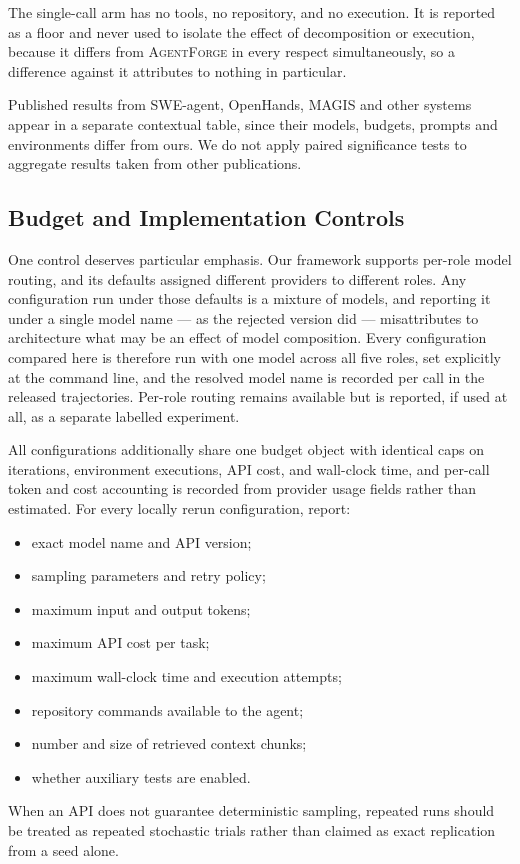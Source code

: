 \documentclass[journal]{IEEEtran}
\newcommand{\agentforge}{\textsc{AgentForge}}
\begin{document}
The single-call arm has no tools, no repository, and no execution. It is reported as a floor and never used to isolate the effect of decomposition or execution, because it differs from \agentforge{} in every respect simultaneously, so a difference against it attributes to nothing in particular.

Published results from SWE-agent, OpenHands, MAGIS and other systems appear in a separate contextual table, since their models, budgets, prompts and environments differ from ours. We do not apply paired significance tests to aggregate results taken from other publications.

\subsection{Budget and Implementation Controls}

One control deserves particular emphasis. Our framework supports per-role model routing, and its defaults assigned different providers to different roles. Any configuration run under those defaults is a mixture of models, and reporting it under a single model name — as the rejected version did — misattributes to architecture what may be an effect of model composition. Every configuration compared here is therefore run with one model across all five roles, set explicitly at the command line, and the resolved model name is recorded per call in the released trajectories. Per-role routing remains available but is reported, if used at all, as a separate labelled experiment.

All configurations additionally share one budget object with identical caps on iterations, environment executions, API cost, and wall-clock time, and per-call token and cost accounting is recorded from provider usage fields rather than estimated. For every locally rerun configuration, report:
\begin{itemize}
    \item exact model name and API version;
    \item sampling parameters and retry policy;
    \item maximum input and output tokens;
    \item maximum API cost per task;
    \item maximum wall-clock time and execution attempts;
    \item repository commands available to the agent;
    \item number and size of retrieved context chunks;
    \item whether auxiliary tests are enabled.
\end{itemize}
When an API does not guarantee deterministic sampling, repeated runs should be treated as repeated stochastic trials rather than claimed as exact replication from a seed alone.
\end{document}
